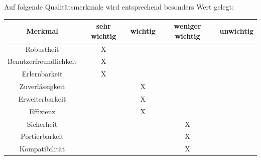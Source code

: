 \documentclass[parskip=full]{scrartcl}
\begin{document}
Auf folgende Qualitätsmerkmale wird entsprechend besonders Wert gelegt:

\begin{tabular}{ | c | c | c | c | c | }
	\hline
	\textbf{Merkmal} & \textbf{sehr wichtig} & \textbf{wichtig} & \textbf{weniger wichtig} & \textbf{unwichtig} \\
	\hline
	Robustheit & X & & & \\
	Benutzerfreundlichkeit & X & & & \\
	Erlernbarkeit & X & & & \\
	Zuverlässigkeit & & X & & \\
	Erweiterbarkeit & & X & & \\
	Effizienz & & X & & \\
	Sicherheit & & & X & \\
	Portierbarkeit & & & X & \\
	Kompatibilität & & & X & \\
	\hline
\end{tabular}
\end{document}
